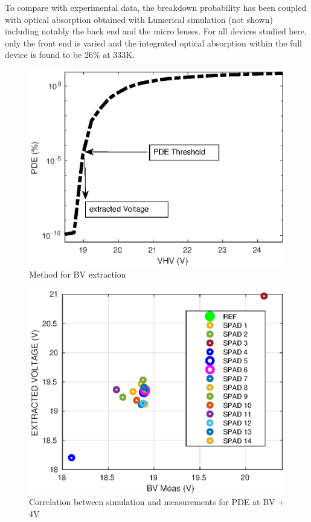 \documentclass[10pt,a4paper,twocolumn]{article}
\begin{document}
To compare with experimental data, the breakdown probability has been coupled with optical absorption obtained with Lumerical simulation (not shown) including notably the back end and the micro lenses. For all devices studied here, only the front end is varied  and the integrated optical absorption within the full device is found to be 26\% at 333K. 


\begin{figure}[h!]
\centering
\includegraphics[scale=0.65]{../pictures/000_McIntyre_Bench_Method.eps}
\caption{Method for BV extraction}
\label{fig:BVExtract}
\end{figure}


\begin{figure}[h!]
\centering
\includegraphics[scale=0.65]{../pictures/000_McIntyre_Bench_GR5_graphs_BV.eps}
\caption{Correlation between simulation and measurements for PDE at BV + 4V}
\label{fig:BVCorrel}
\end{figure}
\end{document}

